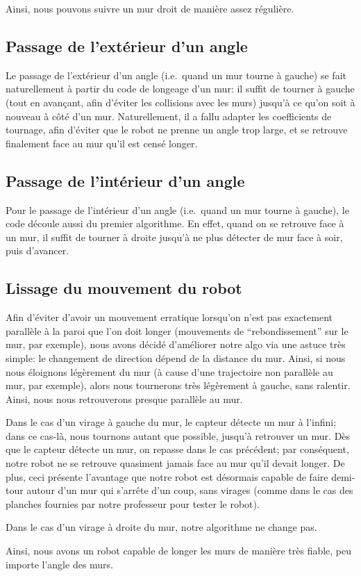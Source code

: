 \documentclass{report}
\begin{document}
Ainsi, nous pouvons suivre un mur droit de manière assez régulière.

\subsection{Passage de l'extérieur d'un angle}

Le passage de l'extérieur d'un angle (i.e.\ quand un mur tourne à
gauche) se fait naturellement à partir du code de longeage d'un mur:
il suffit de tourner à gauche (tout en avançant, afin d'éviter les
collisions avec les murs) jusqu'à ce qu'on soit à nouveau à côté d'un
mur. Naturellement, il a fallu adapter les coefficients de tournage,
afin d'éviter que le robot ne prenne un angle trop large, et se
retrouve finalement face au mur qu'il est censé longer.

\subsection{Passage de l'intérieur d'un angle}

Pour le passage de l'intérieur d'un angle (i.e.\ quand un mur tourne à
gauche), le code découle aussi du premier algorithme. En effet, quand
on se retrouve face à un mur, il suffit de tourner à droite jusqu'à ne
plus détecter de mur face à soir, puis d'avancer.

\subsection{Lissage du mouvement du robot}

Afin d'éviter d'avoir un mouvement erratique lorsqu'on n'est pas
exactement parallèle à la paroi que l'on doit longer (mouvements de
``rebondissement'' sur le mur, par exemple), nous avons décidé
d'améliorer notre algo via une astuce très simple: le changement de
direction dépend de la distance du mur. Ainsi, si nous nous éloignons
légèrement du mur (à cause d'une trajectoire non parallèle au mur, par
exemple), alors nous tournerons très légèrement à gauche, sans
ralentir. Ainsi, nous nous retrouverons presque parallèle au mur.

Dans le cas d'un virage à gauche du mur, le capteur détecte un mur à
l'infini; dans ce cas-là, nous tournons autant que possible, jusqu'à
retrouver un mur. Dès que le capteur détecte un mur, on repasse dans
le cas précédent; par conséquent, notre robot ne se retrouve quasiment
jamais face au mur qu'il devait longer. De plus, ceci présente
l'avantage que notre robot est désormais capable de faire demi-tour
autour d'un mur qui s'arrête d'un coup, sans virages (comme dans le
cas des planches fournies par notre professeur pour tester le robot).

Dans le cas d'un virage à droite du mur, notre algorithme ne change
pas.

Ainsi, nous avons un robot capable de longer les murs de manière très
fiable, peu importe l'angle des murs.
\end{document}
